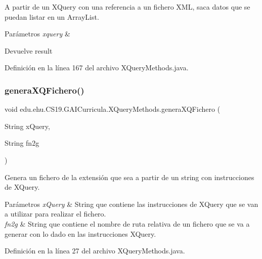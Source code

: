A partir de un X\+Query con una referencia a un fichero X\+ML, saca datos que se puedan listar en un Array\+List. 


\begin{DoxyParams}{Parámetros}
{\em xquery} & \\
\hline
\end{DoxyParams}
\begin{DoxyReturn}{Devuelve}
result 
\end{DoxyReturn}


Definición en la línea 167 del archivo X\+Query\+Methods.\+java.

\mbox{\label{classedu_1_1ehu_1_1_c_s19_1_1_g_a_i_curricula_1_1_x_query_methods_a7d2040d47b8350ca48da7ce5b658fab2}} 
\subsubsection{\texorpdfstring{generaXQFichero()}{generaXQFichero()}}
{\footnotesize\ttfamily void edu.\+ehu.\+C\+S19.\+G\+A\+I\+Curricula.\+X\+Query\+Methods.\+genera\+X\+Q\+Fichero (\begin{DoxyParamCaption}\item[{String}]{x\+Query,  }\item[{String}]{fn2g }\end{DoxyParamCaption})}



Genera un fichero de la extensión que sea a partir de un string con instrucciones de X\+Query. 


\begin{DoxyParams}{Parámetros}
{\em x\+Query} & String que contiene las instrucciones de X\+Query que se van a utilizar para realizar el fichero. \\
\hline
{\em fn2g} & String que contiene el nombre de ruta relativa de un fichero que se va a generar con lo dado en las instrucciones X\+Query. \\
\hline
\end{DoxyParams}


Definición en la línea 27 del archivo X\+Query\+Methods.\+java.

\mbox{\label{classedu_1_1ehu_1_1_c_s19_1_1_g_a_i_curricula_1_1_x_query_methods_ae60f32c5f8b4ffe3f2bdd1f44976eacf}} 
